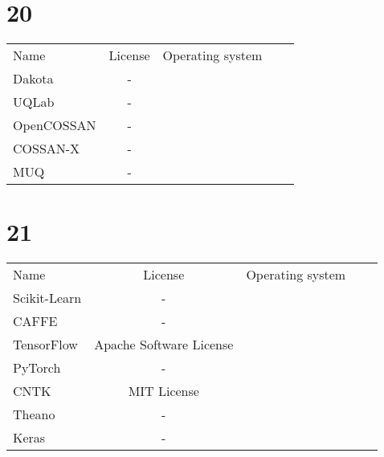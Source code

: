 \section{20}

\begin{table}[]
    \centering
    \begin{tabular}{l|cccc}
    \toprule
    Name &  License & Operating system\\
        Dakota & - &\\
        UQLab & - &\\
        OpenCOSSAN & - &\\
        COSSAN-X & - &\\
        MUQ & - &\\

    \bottomrule
    \end{tabular}
    \end{table}

\section{21}

\begin{table}[]
    \centering
    \begin{tabular}{l|cccc}
    \toprule
    Name &  License & Operating system\\
        Scikit-Learn & - &\\
        CAFFE & - &\\
        TensorFlow &  Apache Software License &\\
        PyTorch & - &\\
        CNTK &  MIT License &\\
        Theano & - &\\
        Keras & - &\\

    \bottomrule
    \end{tabular}
    \end{table}
